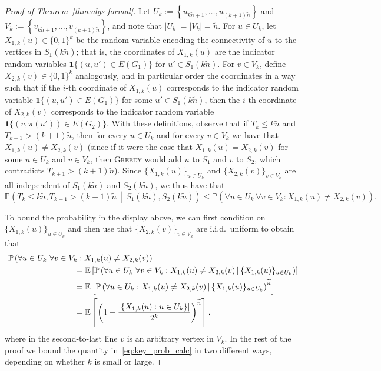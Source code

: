 \documentclass[11pt]{article}
\theoremstyle{plain}
\theoremstyle{definition}
\theoremstyle{remark}
\newcommand{\greedy}{\textsc{Greedy} }
\newcommand{\E}{\mathbb{E}}
\renewcommand{\Pr}{\mathbb{P}}
\begin{document}
\begin{proof}[Proof of Theorem~\ref{thm:algs-formal}]
Let 
$U_{k} := \left\{ u_{k \widetilde{n}+1}, \ldots, u_{(k+1)\widetilde{n}} \right\}$ 
and 
$V_{k} := \left\{ v_{k \widetilde{n}+1}, \ldots, v_{(k+1)\widetilde{n}} \right\}$, 
and note that $|U_{k}| = |V_{k}| = \widetilde{n}$. 
For $u \in U_{k}$, 
let $X_{1,k}(u) \in \{0,1\}^{k}$ be the random variable encoding the connectivity of $u$ to the vertices in $S_{1}(k \widetilde{n})$; that is, the coordinates of $X_{1,k}(u)$ are the indicator random variables $\mathbf{1}{\{ (u,u') \in E(G_{1})\}}$ 
for $u' \in S_{1}(k \widetilde{n})$. 
For $v \in V_{k}$, 
define $X_{2,k}(v) \in \{0,1\}^{k}$ analogously, 
and in particular order the coordinates in a way such that 
if the $i$-th coordinate of $X_{1,k}(u)$ corresponds to the indicator random variable $\mathbf{1} {\{ (u,u') \in E(G_{1})\}}$ for some $u' \in S_{1}(k \widetilde{n})$, 
then the $i$-th coordinate of $X_{2,k}(v)$ corresponds to the indicator random variable $\mathbf{1} {\{ (v,\pi(u')) \in E(G_{2})\}}$. 
With these definitions, observe that 
if $T_{k} \leq k \widetilde{n}$ and $T_{k+1} > (k+1) \widetilde{n}$, 
then for every $u \in U_{k}$ and for every $v \in V_{k}$ 
we have that $X_{1,k}(u) \neq X_{2,k}(v)$ 
(since if it were the case that $X_{1,k}(u) = X_{2,k}(v)$ 
for some $u \in U_{k}$ and $v \in V_{k}$, 
then \greedy would add $u$ to $S_{1}$ and $v$ to $S_{2}$, 
which contradicts $T_{k+1} > (k+1) \widetilde{n}$). 
Since $\{ X_{1,k}(u) \}_{u \in U_{k}}$ and $\{ X_{2,k} (v) \}_{v \in V_{k}}$ are all independent of $S_{1}(k \widetilde{n})$ and $S_{2}(k \widetilde{n})$, we thus have that 
\begin{equation}\label{eq:block_gap}
\Pr \left( T_{k} \leq k \widetilde{n}, T_{k+1} > (k+1) \widetilde{n} \, \middle| \, S_{1}(k \widetilde{n}), S_{2}(k \widetilde{n}) \right) 
\leq 
\Pr \left( \forall u \in U_{k} \ \forall v \in V_{k} : X_{1,k}(u) \neq X_{2,k}(v) \right). 
\end{equation}

To bound the probability in the display above, we can first condition on $\{ X_{1,k}(u) \}_{u \in U_{k}}$ and then use that $\{ X_{2,k} (v) \}_{v \in V_{k}}$ are i.i.d.\ uniform to obtain that 
\begin{align}
&\Pr \left( \forall u \in U_{k} \ \forall v \in V_{k} : X_{1,k}(u) \neq X_{2,k}(v) \right) \notag \\
&\qquad \qquad \qquad \qquad = \E \left[ \Pr \left( \forall u \in U_{k} \ \forall v \in V_{k} : X_{1,k}(u) \neq X_{2,k}(v) \, \middle| \, \{ X_{1,k}(u) \}_{u \in U_{k}} \right) \right] \notag \\
&\qquad \qquad \qquad \qquad = \E \left[ \Pr \left( \forall u \in U_{k} : X_{1,k}(u) \neq X_{2,k}(v) \, \middle| \, \{ X_{1,k}(u) \}_{u \in U_{k}} \right)^{\widetilde{n}} \right] \notag \\
&\qquad \qquad \qquad \qquad = \E \left[ \left( 1 - \frac{\left| \left\{ X_{1,k}(u) : u \in U_{k} \right\} \right|}{2^{k}} \right)^{\widetilde{n}} \right], \label{eq:key_prob_calc}
\end{align}
where in the second-to-last line $v$ is an arbitrary vertex in $V_{k}$. 
In the rest of the proof we bound the quantity in~\eqref{eq:key_prob_calc} in two different ways, depending on whether $k$ is small or large. 


\end{proof}
\end{document}
